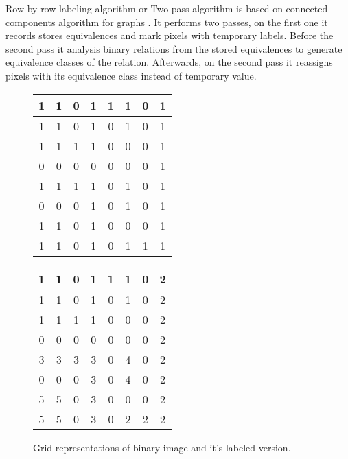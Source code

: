 \documentclass[../../../../main]{subfiles}
\begin{document}
Row by row labeling algorithm or Two-pass algorithm is based on connected components algorithm for graphs \cite{rosenfeldpfaltz}. It performs two passes, on the first one it records stores equivalences and mark pixels with temporary labels. Before the second pass it analysis binary relations from the stored equivalences to generate equivalence classes of the relation. Afterwards, on the second pass it reassigns pixels with its equivalence class instead of temporary value.

\begin{figure} [!ht]
  \centering    
     \begin{tabular}{ |c|c|c|c|c|c|c|c| }
        \hline
        1  & 1  & 0  & 1  & 1  & 1  & 0  & 1\\
        \hline
        1  & 1  & 0  & 1  & 0  & 1  & 0  & 1\\
        \hline
        1  & 1  & 1  & 1  & 0  & 0  & 0  & 1\\
        \hline
        0  & 0  & 0  & 0  & 0  & 0  & 0  & 1\\
        \hline
        1  & 1  & 1  & 1  & 0  & 1  & 0  & 1\\
        \hline
        0  & 0  & 0  & 1  & 0  & 1  & 0  & 1\\
        \hline
        1  & 1  & 0  & 1  & 0  & 0  & 0  & 1\\
        \hline
        1  & 1  & 0  & 1  & 0  & 1  & 1  & 1\\
        \hline
    \end{tabular}
    \begin{tabular}{ |c|c|c|c|c|c|c|c| }
        \hline
        1& 1& 0& 1& 1& 1& 0& 2\\
        \hline
        1& 1& 0& 1& 0& 1& 0& 2\\
        \hline
        1& 1& 1& 1& 0& 0& 0& 2\\
        \hline
        0& 0& 0& 0& 0& 0& 0& 2\\
        \hline
        3& 3& 3& 3& 0& 4& 0& 2\\
        \hline
        0& 0& 0& 3& 0& 4& 0& 2\\
        \hline
        5& 5& 0& 3& 0& 0& 0& 2\\
        \hline
        5& 5& 0& 3& 0& 2& 2& 2\\
        \hline
    \end{tabular}
  \caption{Grid representations of binary image and it's labeled version.}
\end{figure}
\end{document}
